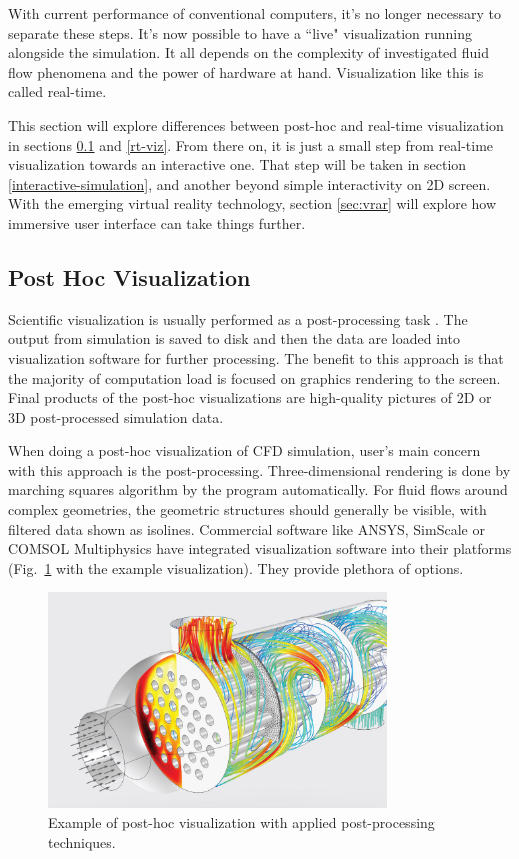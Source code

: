 With current performance of conventional computers, it's no longer necessary to separate these steps. It's now possible to have a ``live" visualization running alongside the simulation. It all depends on the complexity of investigated fluid flow phenomena and the power of hardware at hand. Visualization like this is called real-time.

This section will explore differences between post-hoc and real-time visualization in sections \ref{sec:post-hoc} and \ref{rt-viz}. From there on, it is just a small step from real-time visualization towards an interactive one. That step will be taken in section \ref{interactive-simulation}, and another beyond simple interactivity on 2D screen. With the emerging virtual reality technology, section \ref{sec:vrar} will explore how immersive user interface can take things further.

\subsection{Post Hoc Visualization}\label{sec:post-hoc}
Scientific visualization is usually performed as a post-processing task \citep{kressSituVisualizationTechniques}. The output from simulation is saved to disk and then the data are loaded into visualization software for further processing. The benefit to this approach is that the majority of computation load is focused on graphics rendering to the screen. Final products of the post-hoc visualizations are high-quality pictures of 2D or 3D post-processed simulation data.

When doing a post-hoc visualization of CFD simulation, user's main concern with this approach is the post-processing. Three-dimensional rendering is done by marching squares algorithm by the program automatically. For fluid flows around complex geometries, the geometric structures should generally be visible, with filtered data shown as isolines. Commercial software like ANSYS, SimScale or COMSOL Multiphysics have integrated visualization software into their platforms (Fig.~\ref{fig:comsol-post-hoc-viz} with the example visualization). They provide plethora of options.

\begin{figure}[!ht]
	\centering
	\includegraphics[width=0.8\textwidth]{figures/comsol-post-hoc-viz.jpg}
	\caption{Example of post-hoc visualization with applied post-processing techniques.}
	\label{fig:comsol-post-hoc-viz}
\end{figure}

